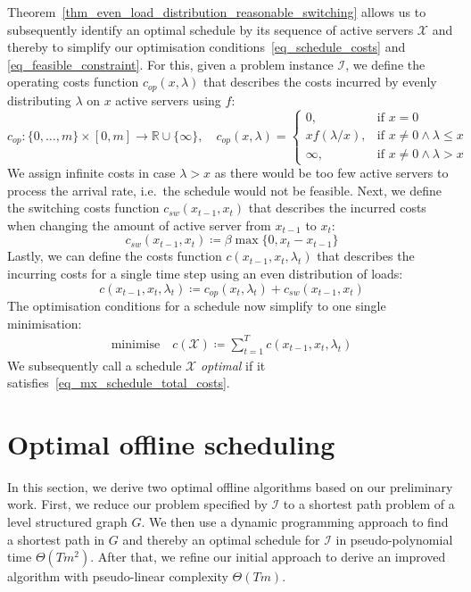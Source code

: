 \documentclass[hidelinks]{article}
\theoremstyle{plain}
\theoremstyle{definition}
\theoremstyle{rem}
\newcommand{\mx}{\mathcal{X}}
\newcommand{\inp}{\mathcal{I}}
\newcommand{\costs}{c}
\newcommand{\opcosts}{c_{op}}
\newcommand{\swcosts}{c_{sw}}
\newcommand{\fromto}[2]{\{#1,\ldots,#2\}}
\begin{document}
Theorem~\ref{thm_even_load_distribution_reasonable_switching} allows us to subsequently identify an optimal schedule by its sequence of active servers $\mx$ and thereby to simplify our optimisation conditions~\eqref{eq_schedule_costs} and \eqref{eq_feasible_constraint}. 
For this, given a problem instance $\inp$, we define the operating costs function $\opcosts(x,\lambda)$ that describes the costs incurred by evenly distributing $\lambda$ on $x$ active servers using $f$:
\begin{equation*}
	\opcosts:\fromto{0}{m}\times[0,m]\rightarrow\mathbb{R}\cup\{\infty\},\quad \opcosts(x,\lambda)=\begin{cases}
          0, & \text{if $x=0$}\\
	  x f(\lambda/x), & \text{if $x\ne 0\land\lambda\le x$}\\
	  \infty, & \text{if $x\ne 0\land\lambda>x$}
	  \end{cases} \label{fct:c}
\end{equation*}
We assign infinite costs in case $\lambda>x$ as there would be too few active servers to process the arrival rate, i.e.\ the schedule would not be feasible. Next, we define the switching costs function $\swcosts(x_{t-1},x_t)$ that describes the incurred costs when changing the amount of active server from $x_{t-1}$ to $x_t$:
\begin{equation}\label{eq_mx_schedule_sw_costs}
	\swcosts(x_{t-1},x_t)\coloneqq\beta\max\{0,x_t-x_{t-1}\}
\end{equation}
Lastly, we can define the costs function $\costs(x_{t-1},x_t,\lambda_t)$ that describes the incurring costs for a single time step using an even distribution of loads:
\begin{equation}\label{eq_mx_schedule_costs}
	\costs(x_{t-1},x_{t},\lambda_t)\coloneqq\opcosts(x_t,\lambda_t)+\swcosts(x_{t-1},x_t)
\end{equation}
The optimisation conditions for a schedule now simplify to one single minimisation:
\begin{align}
	\text{minimise}\quad \costs(\mx)\coloneqq\sum\limits_{t=1}^{T}\costs(x_{t-1},x_{t},\lambda_t)\label{eq_mx_schedule_total_costs}
\end{align}
We subsequently call a schedule $\mx$ \textit{optimal} if it satisfies~\eqref{eq_mx_schedule_total_costs}.

\section{Optimal offline scheduling}
In this section, we derive two optimal offline algorithms based on our preliminary work.
First, we reduce our problem specified by $\inp$ to a shortest path problem of a level structured graph $G$. We then use a dynamic programming approach to find a shortest path in $G$ and thereby an optimal schedule for $\inp$ in pseudo-polynomial time $\Theta(Tm^2)$.
After that, we refine our initial approach to derive an improved algorithm with pseudo-linear complexity $\Theta(Tm)$.
\end{document}
